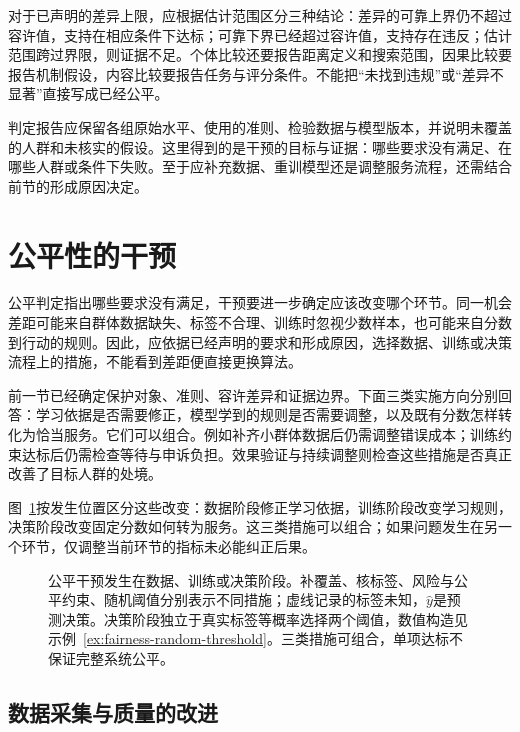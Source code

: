 对于已声明的差异上限，应根据估计范围区分三种结论：差异的可靠上界仍不超过容许值，支持在相应条件下达标；可靠下界已经超过容许值，支持存在违反；估计范围跨过界限，则证据不足。个体比较还要报告距离定义和搜索范围，因果比较要报告机制假设，内容比较要报告任务与评分条件。不能把“未找到违规”或“差异不显著”直接写成已经公平。

判定报告应保留各组原始水平、使用的准则、检验数据与模型版本，并说明未覆盖的人群和未核实的假设。这里得到的是干预的目标与证据：哪些要求没有满足、在哪些人群或条件下失败。至于应补充数据、重训模型还是调整服务流程，还需结合前节的形成原因决定。

\section{公平性的干预}
\label{sec:fairness-intervention}

公平判定指出哪些要求没有满足，干预要进一步确定应该改变哪个环节。同一机会差距可能来自群体数据缺失、标签不合理、训练时忽视少数样本，也可能来自分数到行动的规则。因此，应依据已经声明的要求和形成原因，选择数据、训练或决策流程上的措施，不能看到差距便直接更换算法。

前一节已经确定保护对象、准则、容许差异和证据边界。下面三类实施方向分别回答：学习依据是否需要修正，模型学到的规则是否需要调整，以及既有分数怎样转化为恰当服务。它们可以组合。例如补齐小群体数据后仍需调整错误成本；训练约束达标后仍需检查等待与申诉负担。效果验证与持续调整则检查这些措施是否真正改善了目标人群的处境。

图~\ref{fig:trust-fairness-intervention-stages}按发生位置区分这些改变：数据阶段修正学习依据，训练阶段改变学习规则，决策阶段改变固定分数如何转为服务。这三类措施可以组合；如果问题发生在另一个环节，仅调整当前环节的指标未必能纠正后果。

\begin{figure}[htbp]
  \centering
  
  \caption{公平干预发生在数据、训练或决策阶段。补覆盖、核标签、风险与公平约束、随机阈值分别表示不同措施；虚线记录的标签未知，$\hat y$是预测决策。决策阶段独立于真实标签等概率选择两个阈值，数值构造见示例~\ref{ex:fairness-random-threshold}。三类措施可组合，单项达标不保证完整系统公平。}
  \label{fig:trust-fairness-intervention-stages}
\end{figure}

\subsection{数据采集与质量的改进}
\label{sec:fairness-data-intervention}

